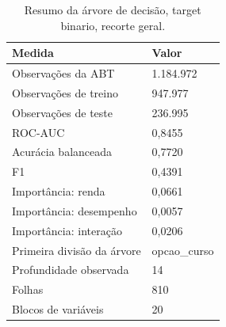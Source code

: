\begin{table}
\caption{Resumo da árvore de decisão, target binario, recorte geral.}
\label{tab:tabela_treeClassification_binario_recorte_geral_principal_holdout_80_20_e5}
\begin{tabular}{ll}
\toprule
Medida & Valor \\
\midrule
Observações da ABT & 1.184.972 \\
Observações de treino & 947.977 \\
Observações de teste & 236.995 \\
ROC-AUC & 0,8455 \\
Acurácia balanceada & 0,7720 \\
F1 & 0,4391 \\
Importância: renda & 0,0661 \\
Importância: desempenho & 0,0057 \\
Importância: interação & 0,0206 \\
Primeira divisão da árvore & opcao\_curso \\
Profundidade observada & 14 \\
Folhas & 810 \\
Blocos de variáveis & 20 \\
\bottomrule
\end{tabular}
\end{table}
